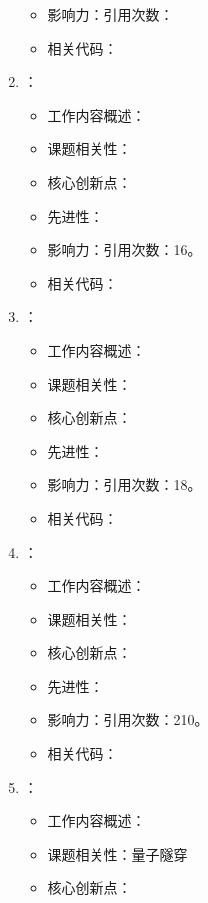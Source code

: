 \begin{enumerate}
\begin{itemize}
                \item 影响力：引用次数：
                \item 相关代码：
            \end{itemize}
            \item \citet{schmidt2005green}：
            \begin{itemize}
                \item 工作内容概述：
                \item 课题相关性：
                \item 核心创新点：
                \item 先进性：
                \item 影响力：引用次数：16。
                \item 相关代码：
            \end{itemize}
            \item \citet{inack2015simulated}：
            \begin{itemize}
                \item 工作内容概述：
                \item 课题相关性：
                \item 核心创新点：
                \item 先进性：
                \item 影响力：引用次数：18。
                \item 相关代码：
            \end{itemize}
            \item \citet{heim2015quantum}：
            \begin{itemize}
                \item 工作内容概述：
                \item 课题相关性：
                \item 核心创新点：
                \item 先进性：
                \item 影响力：引用次数：210。
                \item 相关代码：
            \end{itemize}
            \item \citet{isakov2016understanding}：
            \begin{itemize}
                \item 工作内容概述：
                \item 课题相关性：量子隧穿
                \item 核心创新点：

\end{itemize}
\end{enumerate}
